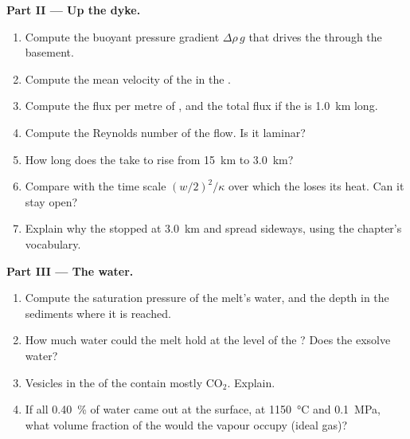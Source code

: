 \begin{problem}
\noindent\textbf{Part II --- Up the dyke.}
\begin{enumerate}[resume]
\item Compute the buoyant pressure gradient $\Delta\rho\,g$ that drives the 
through the basement.
\item Compute the mean velocity of the  in the .
\item Compute the flux per metre of , and the total flux if the  is
\qty{1.0}{km} long.
\item Compute the Reynolds number of the flow. Is it laminar?
\item How long does the  take to rise from \qty{15}{km} to \qty{3.0}{km}?
\item Compare with the time scale $(w/2)^2/\kappa$ over which the  loses its
heat. Can it stay open?
\item Explain why the  stopped at \qty{3.0}{km} and spread sideways, using
the chapter's vocabulary.
\end{enumerate}

\noindent\textbf{Part III --- The water.}
\begin{enumerate}[resume]
\item Compute the saturation pressure of the melt's water, and the depth in the
sediments where it is reached.
\item How much water could the melt hold at the level of the ? Does the 
 exsolve water?
\item Vesicles in the  of the  contain mostly CO$_2$. Explain.
\item If all \qty{0.40}{\percent} of water came out at the surface, at
\qty{1150}{\celsius} and \qty{0.1}{MPa}, what volume fraction of the  would
the vapour occupy (ideal gas)?
\end{enumerate}


\end{problem}
